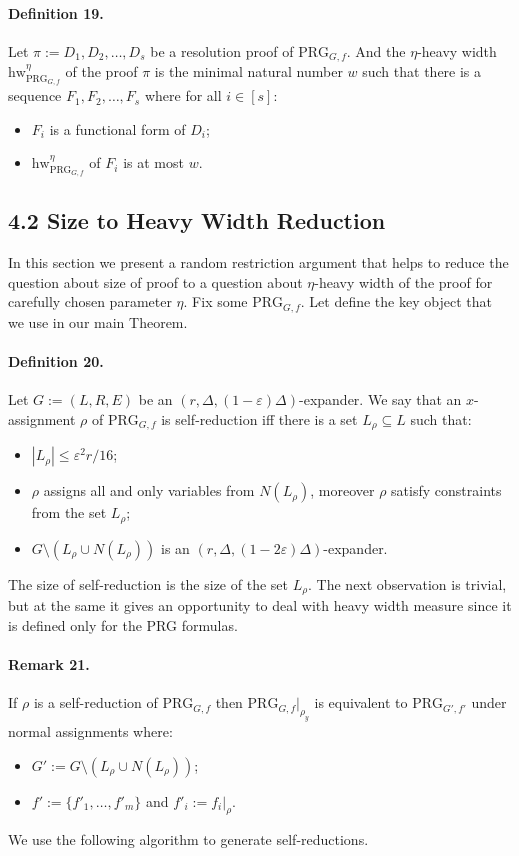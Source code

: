 \paragraph{Definition 19.} Let $\pi:=D_1,D_2,\ldots,D_s$ be a resolution proof of $\mathrm{PRG}_{G,f}$. And the $\eta$-heavy width $\mathrm{hw}_{\mathrm{PRG}_{G,f}}^\eta$ of the proof $\pi$ is the minimal natural number $w$ such that there is a sequence $F_1,F_2,\ldots,F_s$ where for all $i\in[s]$:
\begin{itemize}
\item $F_i$ is a functional form of $D_i$;
\item $\mathrm{hw}_{\mathrm{PRG}_{G,f}}^\eta$ of $F_i$ is at most $w$.
\end{itemize}
\subsection*{4.2 Size to Heavy Width Reduction}
In this section we present a random restriction argument that helps to reduce the question about size of proof to a question about $\eta$-heavy width of the proof for carefully chosen parameter $\eta$. Fix some $\mathrm{PRG}_{G,f}$.
Let define the key object that we use in our main Theorem.
\paragraph{Definition 20.} Let $G:=(L,R,E)$ be an $(r,\Delta,(1-\varepsilon)\Delta)$-expander. We say that an $x$-assignment $\rho$ of $\mathrm{PRG}_{G,f}$ is self-reduction iff there is a set $L_\rho\subseteq L$ such that:
\begin{itemize}
\item $|L_\rho|\leq\varepsilon^2r/16$;
\item $\rho$ assigns all and only variables from $N(L_\rho)$, moreover $\rho$ satisfy constraints from the set $L_\rho$;
\item $G\setminus(L_\rho\cup N(L_\rho))$ is an $(r,\Delta,(1-2\varepsilon)\Delta)$-expander.
\end{itemize}
The size of self-reduction is the size of the set $L_\rho$.
The next observation is trivial, but at the same it gives an opportunity to deal with heavy width measure since it is defined only for the PRG formulas.
\paragraph{Remark 21.} If $\rho$ is a self-reduction of $\mathrm{PRG}_{G,f}$ then $\mathrm{PRG}_{G,f}|_{\rho_y}$ is equivalent to $\mathrm{PRG}_{G',f'}$ under normal assignments where:
\begin{itemize}
\item $G':=G\setminus(L_\rho\cup N(L_\rho))$;
\item $f':=\{f'_1,\ldots,f'_m\}$ and $f'_i:=f_i|_\rho$.
\end{itemize}
We use the following algorithm to generate self-reductions.
